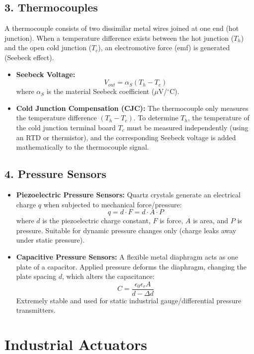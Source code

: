 \documentclass[12pt,a4paper]{article}
\begin{document}
\subsection{3. Thermocouples}
A thermocouple consists of two dissimilar metal wires joined at one end (hot junction). When a temperature difference exists between the hot junction ($T_h$) and the open cold junction ($T_c$), an electromotive force (emf) is generated (Seebeck effect).
\begin{itemize}[leftmargin=*, itemsep=2.5pt]
  \item \textbf{Seebeck Voltage:}
    \[
    V_{out} = \alpha_{S} (T_h - T_c)
    \]
    where $\alpha_{S}$ is the material Seebeck coefficient ($\mu$V/$^\circ$C).
  \item \textbf{Cold Junction Compensation (CJC):} The thermocouple only measures the temperature difference $(T_h - T_c)$. To determine $T_h$, the temperature of the cold junction terminal board $T_c$ must be measured independently (using an RTD or thermistor), and the corresponding Seebeck voltage is added mathematically to the thermocouple signal.
\end{itemize}

\subsection{4. Pressure Sensors}
\begin{itemize}[leftmargin=*, itemsep=2.5pt]
  \item \textbf{Piezoelectric Pressure Sensors:} Quartz crystals generate an electrical charge $q$ when subjected to mechanical force/pressure:
    \[
    q = d \cdot F = d \cdot A \cdot P
    \]
    where $d$ is the piezoelectric charge constant, $F$ is force, $A$ is area, and $P$ is pressure. Suitable for dynamic pressure changes only (charge leaks away under static pressure).
  \item \textbf{Capacitive Pressure Sensors:} A flexible metal diaphragm acts as one plate of a capacitor. Applied pressure deforms the diaphragm, changing the plate spacing $d$, which alters the capacitance:
    \[
    C = \frac{\epsilon_0 \epsilon_r A}{d - \Delta d}
    \]
    Extremely stable and used for static industrial gauge/differential pressure transmitters.
\end{itemize}

\section{Industrial Actuators}
\end{document}
